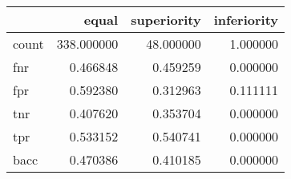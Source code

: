 \begin{tabular}{lrrr}
\toprule
{} &       equal &  superiority &  inferiority \\
\midrule
count &  338.000000 &    48.000000 &     1.000000 \\
fnr   &    0.466848 &     0.459259 &     0.000000 \\
fpr   &    0.592380 &     0.312963 &     0.111111 \\
tnr   &    0.407620 &     0.353704 &     0.000000 \\
tpr   &    0.533152 &     0.540741 &     0.000000 \\
bacc  &    0.470386 &     0.410185 &     0.000000 \\
\bottomrule
\end{tabular}
